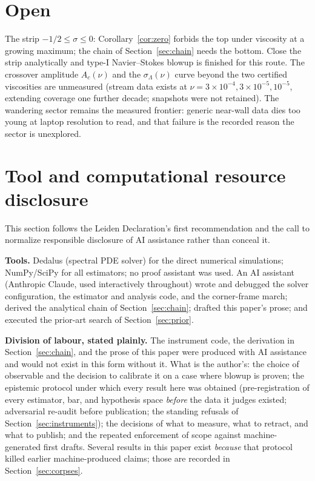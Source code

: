 \documentclass[11pt]{article}
\newcommand{\sL}{\sigma_{\!\Lambda}}
\begin{document}
\section{Open}\label{sec:open}

The strip $-1/2\le\sigma\le0$: Corollary~\ref{cor:zero} forbids the top
under viscosity at a growing maximum; the chain of
Section~\ref{sec:chain} needs the bottom. Close the strip analytically and
type-I Navier--Stokes blowup is finished for this route. The crossover
amplitude $A_c(\nu)$ and the $\sL(\nu)$ curve beyond the two certified
viscosities are unmeasured (stream data exists at
$\nu=3\times10^{-4},3\times10^{-5},10^{-5}$, extending coverage one
further decade; snapshots were not retained).
The wandering sector remains the measured frontier: generic near-wall data
dies too young at laptop resolution to read, and that failure is the
recorded reason the sector is unexplored.


\section{Tool and computational resource disclosure}\label{sec:disclosure}

This section follows the Leiden Declaration's first recommendation
\cite{Leiden26} and the call to normalize responsible disclosure of AI
assistance rather than conceal it.

\textbf{Tools.} Dedalus (spectral PDE solver) for the direct numerical
simulations; NumPy/SciPy for all estimators; no proof assistant was
used. An AI assistant (Anthropic Claude, used interactively throughout)
wrote and debugged the solver configuration, the estimator and
analysis code, and the corner-frame march; derived the analytical chain
of Section~\ref{sec:chain}; drafted this paper's prose; and executed the
prior-art search of Section~\ref{sec:prior}.

\textbf{Division of labour, stated plainly.} The instrument code, the
derivation in Section~\ref{sec:chain}, and the prose of this paper were
produced with AI assistance and would not exist in this form without
it. What is the author's: the choice of observable and the decision to
calibrate it on a case where blowup is proven; the epistemic protocol
under which every result here was obtained (pre-registration of every
estimator, bar, and hypothesis space \emph{before} the data it judges
existed; adversarial re-audit before publication; the standing refusals
of Section~\ref{sec:instruments}); the decisions of what to measure,
what to retract, and what to publish; and the repeated enforcement of
scope against machine-generated first drafts. Several results in this
paper exist \emph{because} that protocol killed earlier machine-produced
claims; those are recorded in Section~\ref{sec:corpses}.
\end{document}
